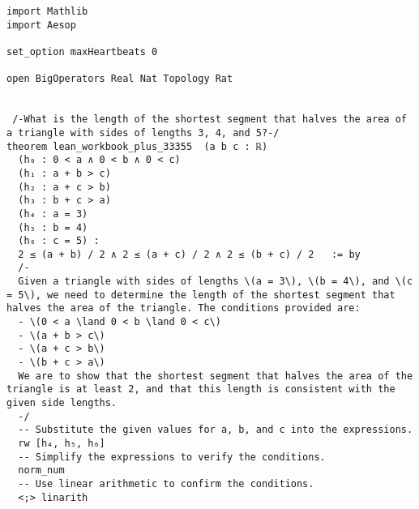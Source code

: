 \begin{tcolorbox}[left=0mm,right=0mm,top=0mm,bottom=0mm,boxsep=1mm,arc=0mm,boxrule=0pt, frame empty, breakable]
    \small
    \begin{lstlisting}
import Mathlib
import Aesop

set_option maxHeartbeats 0

open BigOperators Real Nat Topology Rat


 /-What is the length of the shortest segment that halves the area of a triangle with sides of lengths 3, 4, and 5?-/ 
theorem lean_workbook_plus_33355  (a b c : ℝ)
  (h₀ : 0 < a ∧ 0 < b ∧ 0 < c)
  (h₁ : a + b > c)
  (h₂ : a + c > b)
  (h₃ : b + c > a)
  (h₄ : a = 3)
  (h₅ : b = 4)
  (h₆ : c = 5) :
  2 ≤ (a + b) / 2 ∧ 2 ≤ (a + c) / 2 ∧ 2 ≤ (b + c) / 2   := by
  /-
  Given a triangle with sides of lengths \(a = 3\), \(b = 4\), and \(c = 5\), we need to determine the length of the shortest segment that halves the area of the triangle. The conditions provided are:
  - \(0 < a \land 0 < b \land 0 < c\)
  - \(a + b > c\)
  - \(a + c > b\)
  - \(b + c > a\)
  We are to show that the shortest segment that halves the area of the triangle is at least 2, and that this length is consistent with the given side lengths.
  -/
  -- Substitute the given values for a, b, and c into the expressions.
  rw [h₄, h₅, h₆]
  -- Simplify the expressions to verify the conditions.
  norm_num
  -- Use linear arithmetic to confirm the conditions.
  <;> linarith
\end{lstlisting}
\end{tcolorbox}
